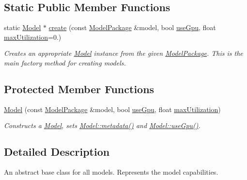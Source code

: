 \subsection*{Static Public Member Functions}
\begin{DoxyCompactItemize}
\item 
static \hyperlink{classdg_1_1deepcore_1_1classification_1_1_model}{Model} $\ast$ \hyperlink{group___classification_module_ga7b908a0f56b71ac72ae872e903a042e2}{create} (const \hyperlink{classdg_1_1deepcore_1_1classification_1_1_model_package}{Model\+Package} \&model, bool \hyperlink{group___classification_module_gaea38e3353458ab22d099d54411d6f868}{use\+Gpu}, float \hyperlink{group___classification_module_ga08d73772f04eb0553e4d787c69b34aa2}{max\+Utilization}=0.)
\begin{DoxyCompactList}\small\item\em Creates an appropriate \hyperlink{classdg_1_1deepcore_1_1classification_1_1_model}{Model} instance from the given \hyperlink{classdg_1_1deepcore_1_1classification_1_1_model_package}{Model\+Package}. This is the main factory method for creating models. \end{DoxyCompactList}\end{DoxyCompactItemize}
\subsection*{Protected Member Functions}
\begin{DoxyCompactItemize}
\item 
\hyperlink{group___classification_module_gac3f95551de3a41eb2bbda756cda5fc07}{Model} (const \hyperlink{classdg_1_1deepcore_1_1classification_1_1_model_package}{Model\+Package} \&model, bool \hyperlink{group___classification_module_gaea38e3353458ab22d099d54411d6f868}{use\+Gpu}, float \hyperlink{group___classification_module_ga08d73772f04eb0553e4d787c69b34aa2}{max\+Utilization})
\begin{DoxyCompactList}\small\item\em Constructs a \hyperlink{classdg_1_1deepcore_1_1classification_1_1_model}{Model}, sets \hyperlink{group___classification_module_ga33bdb8fac324a49d0e70175a1440cdd1}{Model\+::metadata()} and \hyperlink{group___classification_module_gaea38e3353458ab22d099d54411d6f868}{Model\+::use\+Gpu()}. \end{DoxyCompactList}\end{DoxyCompactItemize}


\subsection{Detailed Description}
An abstract base class for all models. Represents the model capabilities. 